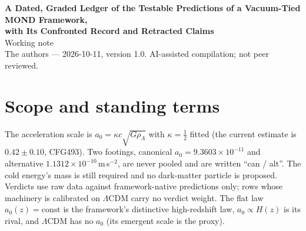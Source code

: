 \documentclass[10pt]{article}
\begin{document}
\begin{center}
{\Large\bfseries A Dated, Graded Ledger of the Testable Predictions of a Vacuum-Tied MOND Framework,\\ with Its Confronted Record and Retracted Claims}\\[4pt]
{\large Working note}\\[4pt]
{\small The authors --- 2026-10-11, version 1.0. AI-assisted compilation; not peer reviewed.}
\end{center}


\begin{abstract}
\noindent We collect, in one dated ledger, every testable prediction we could find in the working record of a programme built on the law $a_0=\kappa c\sqrt{G\rho_\Lambda}$ with $\kappa=\tfrac12$ \emph{fitted}, together with the numbers the rivals predict, the result that would count against each prediction, and what has already been confronted with data. Each of 98 future tests carries a grade: K1 (the number was fixed before the data exist, by frozen criteria or a sealed hash, with a date and a stated kill condition; 8 tests), K2 (sharp but capped by systematics, conditional, or nearly shared by the rivals; 11), K3 (open: no usable data, no date, or a forecast only; 65) and K4 (speculative or numerology-era predictions that could still be checked but have no derivation and are mostly retracted in the record; 14). We also list 51 confronted results, including the failures, 15 public deposits with their status, and the claims that must not be cited. The dated releases in the next months are the ALMA cubes of 2026-11-06 and 2026-11-28 and Gaia DR4 on 2026-12-02. The neutrino sector, which is entirely conditional and rests on a coincidence that the record itself calls generic, is set out in detail. Nothing here says the data favour the framework, $\kappa$ is not derived, the cold energy's mass is still required, and the theory is not closed.
\end{abstract}


\section{Scope and standing terms}
The acceleration scale is $a_0=\kappa c\sqrt{G\rho_\Lambda}$ with $\kappa=\tfrac12$ fitted (the current estimate is $0.42\pm0.10$, CFG493). Two footings, canonical $a_0=9.3603\times10^{-11}$ and alternative $1.1312\times10^{-10}$\,m\,s$^{-2}$, are never pooled and are written ``can / alt''. The cold energy's mass is still required and no dark-matter particle is proposed. Verdicts use raw data against framework-native predictions only; rows whose machinery is calibrated on $\Lambda$CDM carry no verdict weight. The flat law $a_0(z)=\mathrm{const}$ is the framework's distinctive high-redshift law, $a_0\propto H(z)$ is its rival, and $\Lambda$CDM has no $a_0$ (its emergent scale is the proxy).
\end{document}
